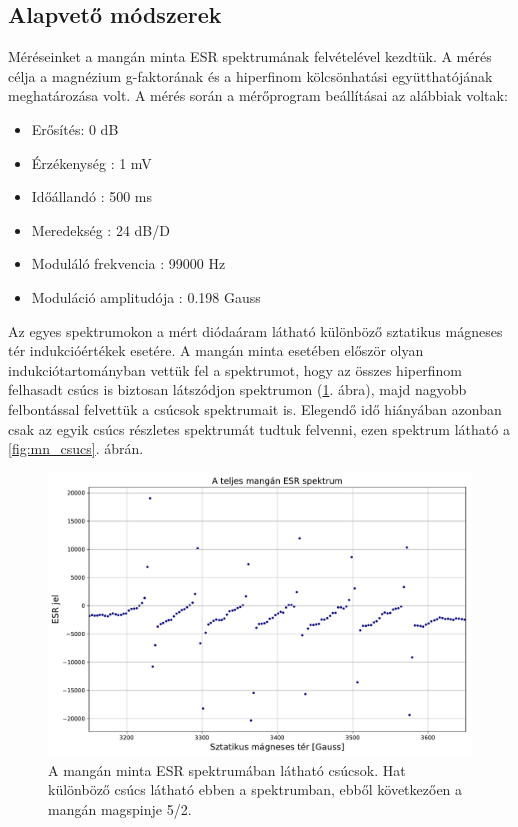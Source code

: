 \documentclass[12pt,a4paper]{article}
\begin{document}
\subsection{Alapvető módszerek}
\hspace*{10pt} Méréseinket a mangán minta ESR spektrumának felvételével kezdtük. A mérés célja a magnézium g-faktorának és a hiperfinom kölcsönhatási együtthatójának meghatározása volt. A mérés során a mérőprogram beállításai az alábbiak voltak:
\begin{itemize}
\item{Erősítés:  0 dB}
\item{Érzékenység : 1 mV}
\item{Időállandó : 500 ms}
\item{Meredekség : 24 dB/D}
\item{Moduláló frekvencia : 99000 Hz}
\item{Moduláció amplitudója : 0.198 Gauss}
\end{itemize} Az egyes spektrumokon a mért diódaáram látható különböző sztatikus mágneses tér indukcióértékek esetére. A mangán minta esetében először olyan indukciótartományban vettük fel a spektrumot, hogy az összes hiperfinom felhasadt csúcs is biztosan látszódjon spektrumon (\ref{fig:mn_teljes}. ábra), majd nagyobb felbontással felvettük a csúcsok spektrumait is. Elegendő idő hiányában azonban csak az egyik csúcs részletes spektrumát tudtuk felvenni, ezen spektrum látható a \ref{fig:mn_csucs}. ábrán.\\
\begin{figure}[!h]
\centering
\includegraphics[scale=0.5]{mang_teljes}
\caption{A mangán minta ESR spektrumában látható csúcsok. Hat különböző csúcs látható ebben a spektrumban, ebből következően a mangán magspinje 5/2.}
\label{fig:mn_teljes}
\end{figure}
\end{document}
